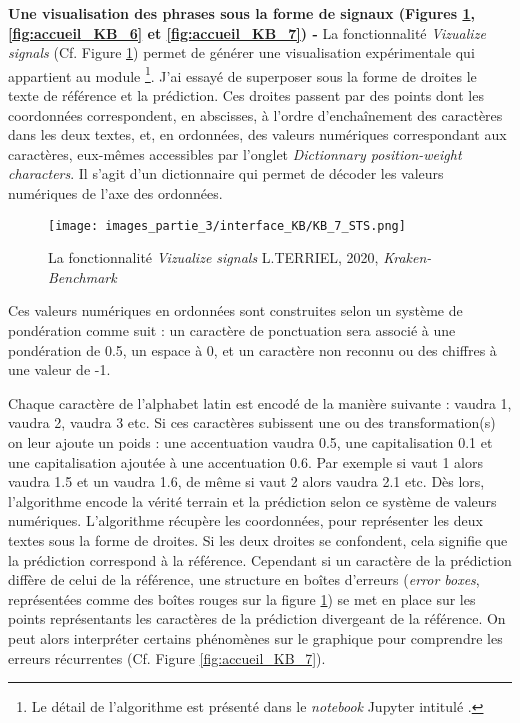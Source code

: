 \textbf{Une visualisation des phrases sous la forme de signaux (Figures \ref{fig:accueil_KB_5},  \ref{fig:accueil_KB_6} et \ref{fig:accueil_KB_7}) - } La fonctionnalité \textit{Vizualize signals} (Cf. Figure \ref{fig:accueil_KB_5}) permet de générer une visualisation expérimentale qui appartient au module \footnote{Le détail de l'algorithme est présenté dans le \textit{notebook} Jupyter intitulé .}. 
J'ai essayé de superposer sous la forme de droites le texte de référence et la prédiction. Ces droites passent par des points dont les coordonnées correspondent, en abscisses, à l'ordre d'enchaînement des caractères dans les deux textes, et, en ordonnées, des valeurs numériques correspondant aux caractères, eux-mêmes accessibles par l'onglet \textit{Dictionnary position-weight characters}. Il s'agit d'un dictionnaire qui permet de décoder les valeurs numériques de l'axe des ordonnées.\\ 

\begin{figure}[h!]
    \centering
    \texttt{[image: images\_partie\_3/interface\_KB/KB\_7\_STS.png]}
        \caption{La fonctionnalité \textit{Vizualize signals} \textcopyright L.TERRIEL, 2020, \textit{Kraken-Benchmark}}
        \label{fig:accueil_KB_5}
\end{figure}
\newpage
Ces valeurs numériques en ordonnées sont construites selon un système de pondération comme suit : un caractère de ponctuation sera associé à une pondération de 0.5, un espace à 0, et un caractère non reconnu ou des chiffres à une valeur de -1.

Chaque caractère de l'alphabet latin est encodé de la manière suivante :  vaudra 1,  vaudra 2,  vaudra 3 etc. 
Si ces caractères subissent une ou des transformation(s) on leur ajoute un poids : une accentuation vaudra 0.5, une capitalisation 0.1 et une capitalisation ajoutée à une accentuation 0.6. Par exemple si  vaut 1 alors  vaudra 1.5 et un  vaudra 1.6, de même si  vaut 2 alors  vaudra 2.1 etc.
Dès lors, l'algorithme encode la vérité terrain et la prédiction selon ce système de valeurs numériques. L'algorithme récupère les coordonnées, pour représenter les deux textes sous la forme de droites. 
Si les deux droites se confondent, cela signifie que la prédiction correspond à la référence. Cependant si un caractère de la prédiction diffère de celui de la référence, une structure en boîtes d'erreurs (\textit{error boxes}, représentées comme des boîtes rouges sur la figure \ref{fig:accueil_KB_5}) se met en place sur les points représentants les caractères de la prédiction divergeant de la référence. On peut alors interpréter certains phénomènes sur le graphique pour comprendre les erreurs récurrentes (Cf. Figure \ref{fig:accueil_KB_7}).\\

